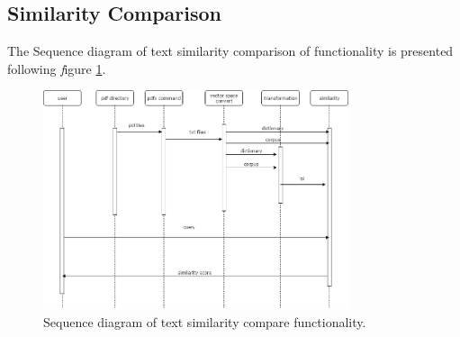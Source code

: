 \subsection{Similarity Comparison}

The Sequence diagram of text  similarity  comparison of functionality is presented  following \textit figure \ref{Sequence diagram}.

	\begin{figure}[htb]
		\begin{center}
			\includegraphics[width=0.8\textwidth]{Rainy_Sequence_diagram}
		\end{center}
		\caption{Sequence diagram of text similarity compare functionality.\label{Sequence diagram}}
	\end{figure}
\newpage